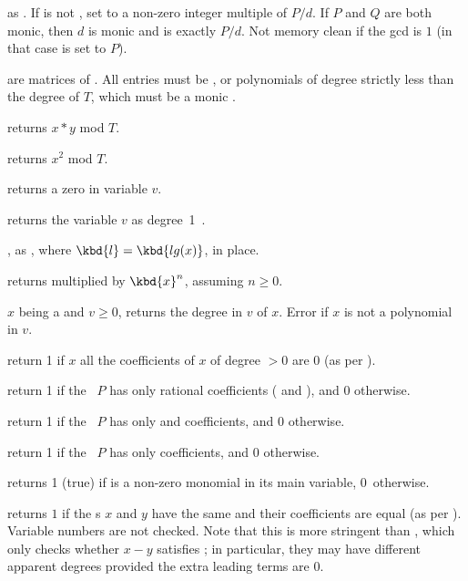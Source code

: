  as .
If  is not , set  to a non-zero integer
multiple of $P/d$. If $P$ and $Q$ are both monic, then $d$ is monic and
 is exactly $P/d$. Not memory clean if the gcd is $1$
(in that case  is set to $P$).


 are matrices of . All entries must be ,  or
polynomials of degree strictly less than the degree of $T$, which must be a monic
.

 returns $x*y$ mod $T$.

 returns $x^2$ mod $T$.


 returns a zero  in variable $v$.

 returns the variable $v$ as degree~1~.

, as , where
$\kbd{l} = \kbd{lg(x)}$, in place.

 returns 
multiplied by $\kbd{x}^n$, assuming $n\geq 0$.



 $x$ being a  and $v \geq 0$,
returns the degree in $v$ of $x$. Error if $x$ is not a polynomial in $v$.

 return 1 if $x$ all the coefficients of
$x$ of degree $> 0$ are $0$ (as per ).

 return 1 if the ~$P$ has only
rational coefficients ( and ), and 0 otherwise.

 return 1 if the ~$P$ has only
 and  coefficients, and 0 otherwise.

 return 1 if the ~$P$ has only
 coefficients, and 0 otherwise.

 returns 1 (true) if  is a non-zero
monomial in its main variable, 0~otherwise.

 returns $1$ if the s $x$ and $y$
have the same  and their coefficients are equal (as per
). Variable numbers are not checked. Note that this is more
stringent than , which only checks whether $x - y$ satisfies
; in particular, they may have different apparent degrees provided
the extra leading terms are $0$.

